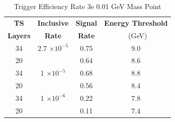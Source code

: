 \begin{table}
 \centering
\caption{Trigger Efficiency Rate 3e 0.01 GeV Mass Point}
\begin{tabular}{ c | c | c | c }
\textbf{TS} & \textbf{Inclusive} & \textbf{Signal} & \textbf{Energy Threshold}  \\ \textbf{Layers} & \textbf{Rate} & \textbf{Rate} & \ (GeV) \\ 
\hline
34 & 2.7 $\times 10^{-5}$ & 0.75 & 9.0 \\ 
20 & & 0.64 & 8.6 \\ 
\hline 
34 & 1 $\times 10^{-5}$ & 0.68 & 8.8 \\ 
20 & & 0.56 & 8.4 \\ 
\hline 
34 & 1 $\times 10^{-6}$ & 0.22 & 7.8 \\ 
20 & & 0.11 & 7.4 \\ 
\hline 
\end{tabular}
\end{table}
